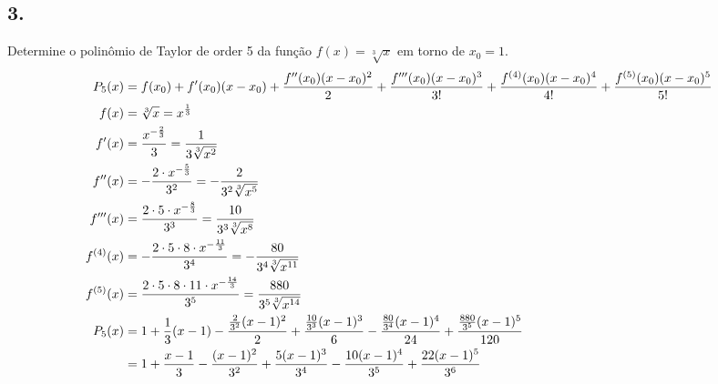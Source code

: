 \documentclass{article}
\begin{document}

\subsection{3.}
Determine o polinômio de Taylor de order 5 da função $f(x) = \sqrt[3]{x}$ em
torno de $x_0 = 1$.
\begin{align}
  P_5(x)
  &= f(x_0)
  + f'(x_0)(x - x_0)
  + \frac{f''(x_0)(x - x_0)^2}{2}
  + \frac{f'''(x_0)(x - x_0)^3}{3!}
  + \frac{f^{(4)}(x_0)(x - x_0)^4}{4!}
  + \frac{f^{(5)}(x_0)(x - x_0)^5}{5!} \\
  f(x)
  &= \sqrt[3]{x}
  = x^{\frac{1}{3}}\\
  f'(x)
  &= \frac{x^{-\frac{2}{3}}}{3}
  = \frac{1}{3 \sqrt[3]{x^2}} \\
  f''(x)
  &= -\frac{2 \cdot x^{-\frac{5}{3}}}{3^2}
  = -\frac{2}{3^2 \sqrt[3]{x^5}} \\
  f'''(x)
  &= \frac{2 \cdot 5 \cdot x^{-\frac{8}{3}}}{3^3}
  = \frac{10}{3^3 \sqrt[3]{x^8}} \\
  f^{(4)}(x)
  &= -\frac{2 \cdot 5 \cdot 8 \cdot x^{-\frac{11}{3}}}{3^4}
  = -\frac{80}{3^4 \sqrt[3]{x^{11}}} \\
  f^{(5)}(x)
  &= \frac{2 \cdot 5 \cdot 8 \cdot 11 \cdot x^{-\frac{14}{3}}}{3^5}
  = \frac{880}{3^5 \sqrt[3]{x^{14}}} \\
  P_5(x)
  &= 1
  + \frac{1}{3}(x - 1)
  - \frac{\frac{2}{3^2}(x - 1)^2}{2}
  + \frac{\frac{10}{3^3}(x - 1)^3}{6}
  - \frac{\frac{80}{3^4}(x - 1)^4}{24}
  + \frac{\frac{880}{3^5}(x - 1)^5}{120} \\
  &= 1
  + \frac{x - 1}{3}
  - \frac{(x - 1)^2}{3^2}
  + \frac{5(x - 1)^3}{3^4}
  - \frac{10(x - 1)^4}{3^5}
  + \frac{22(x - 1)^5}{3^6} \notag
\end{align}
\setcounter{equation}{0}
\clearpage
\end{document}
